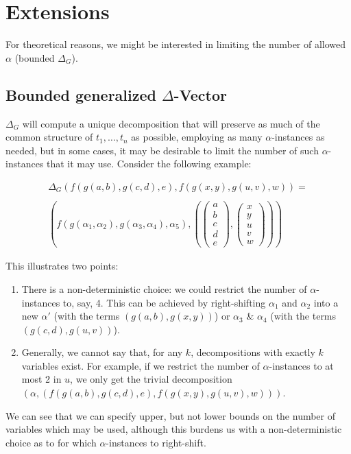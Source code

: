 \documentclass[a4paper, 11pt]{report}
\newcommand{\colvec}[1]{\left(\begin{array}{c}#1\end{array}\right)}
\begin{document}
\section{Extensions}

For theoretical reasons, we might be interested in limiting the number of allowed $\alpha$ (bounded $\Delta_G$).

\subsection{Bounded generalized $\Delta$-Vector}

$\Delta_G$ will compute a unique decomposition that will preserve as much of the common structure of $t_1,\dots,t_n$ as possible, employing as many $\alpha$-instances as needed, but in some cases, it may be desirable to limit the number of such $\alpha$-instances that it may use.
Consider the following example:

$$
\begin{array}{l}
\Delta_G(f(g(a,b),g(c,d),e), f(g(x,y),g(u,v),w)) =\\
\\
\left(f(g(\alpha_1,\alpha_2),g(\alpha_3,\alpha_4),\alpha_5), \left(\colvec{a\\b\\c\\d\\e}, \colvec{x\\y\\u\\v\\w}\right)\right)
\end{array}
$$

This illustrates two points:
\begin{enumerate}
\item There is a non-deterministic choice: we could restrict the number of $\alpha$-instances to, say, 4. This can be achieved by right-shifting $\alpha_1$ and $\alpha_2$ into a new $\alpha'$ (with the terms $(g(a,b),g(x,y))$) or $\alpha_3$ \& $\alpha_4$ (with the terms $(g(c,d),g(u,v))$).
\item Generally, we cannot say that, for any $k$, decompositions with exactly $k$ variables exist. For example, if we restrict the number of $\alpha$-instances to at most 2 in $u$, we only get the trivial decomposition $(\alpha, (f(g(a,b),g(c,d),e), f(g(x,y),g(u,v),w)))$.
\end{enumerate}

We can see that we can specify upper, but not lower bounds on the number of variables which may be used, although this burdens us with a non-deterministic choice as to for which $\alpha$-instances to right-shift.\\
\end{document}
